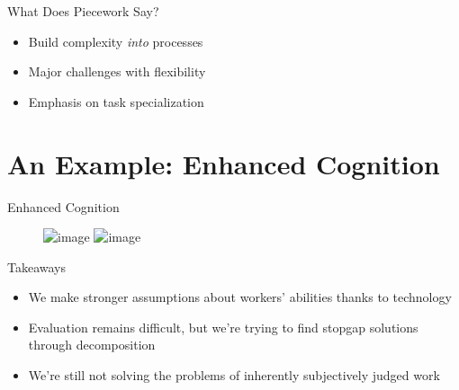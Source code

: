 \documentclass[presentation]{subfiles}
\begin{document}

\begin{frame}{What Does Piecework Say?}
  \begin{itemize}
    \item Build complexity \emph{into} processes
    \item Major challenges with \alert{flexibility}
    \item Emphasis on task \alert{specialization}
  \end{itemize}
\end{frame}

\section{An Example: Enhanced Cognition}

\begin{frame}{Enhanced Cognition} %
  \begin{figure}
  \includegraphics<1>[width=\textwidth]{../common_figures/photo/knowledge-student.jpg}
  \includegraphics<3>[width=\textwidth]{../common_figures/photo/gps-map.jpg}
  \end{figure}
\end{frame}

\begin{frame}{Takeaways}
  \begin{itemize}
    \item We make stronger assumptions about workers' abilities thanks to technology
    \item Evaluation remains difficult, but we're trying to find stopgap solutions through decomposition
    \item We're still not solving the problems of inherently subjectively judged work
  \end{itemize}
\end{frame}
\end{document}
